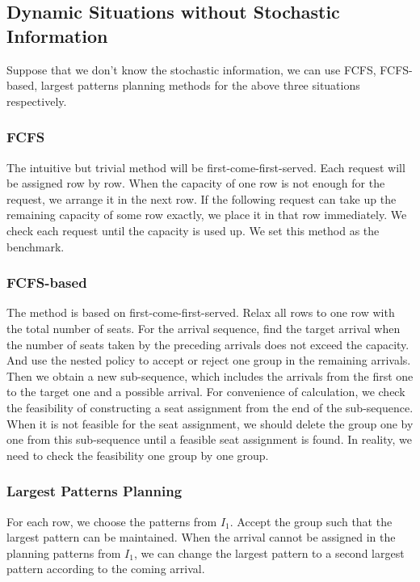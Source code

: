 \subsection{Dynamic Situations without Stochastic Information}

Suppose that we don't know the stochastic information, we can use FCFS, FCFS-based, largest patterns planning methods for the above three situations respectively. 

\subsubsection{FCFS}
The intuitive but trivial method will be first-come-first-served. Each request will be assigned row by row. When the capacity of one row is not enough for the request, we arrange it in the next row. If the following request can take up the remaining capacity of some row exactly, we place it in that row immediately. We check each request until the capacity is used up. We set this method as the benchmark.


\subsubsection{FCFS-based}\label{FCFS-based}

The method is based on first-come-first-served. Relax all rows to one row with the total number of seats. For the arrival sequence, find the target arrival when the number of seats taken by the preceding arrivals does not exceed the capacity. And use the nested policy to accept or reject one group in the remaining arrivals. Then we obtain a new sub-sequence, which includes the arrivals from the first one to the target one and a possible arrival. For convenience of calculation, we check the feasibility of constructing a seat assignment from the end of the sub-sequence. When it is not feasible for the seat assignment, we should delete the group one by one from this sub-sequence until a feasible seat assignment is found. In reality, we need to check the feasibility one group by one group. 

\subsubsection{Largest Patterns Planning}\label{largest_pattern}
For each row, we choose the patterns from $I_1$. Accept the group such that the largest pattern can be maintained. When the arrival cannot be assigned in the planning patterns from $I_1$, we can change the largest pattern to a second largest pattern according to the coming arrival.


